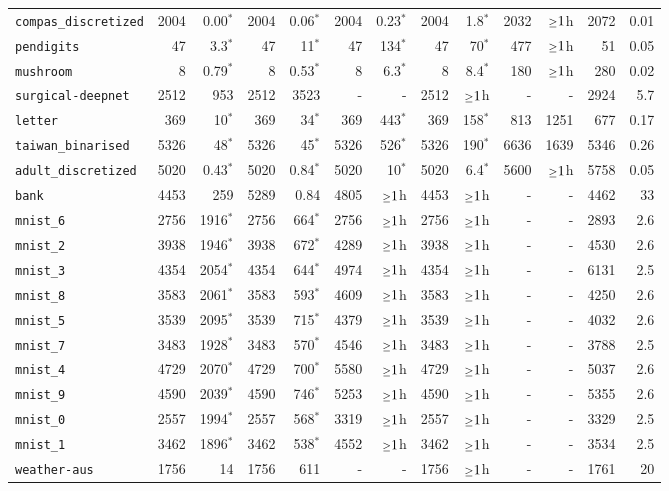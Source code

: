 \begin{tabular}{lrrrrrrrrrrrr}
\texttt{compas\_discretized} & 2004 & 0.00$^*$ & 2004 & 0.06$^*$ & 2004 & 0.23$^*$ & 2004 & 1.8$^*$ & 2032 & $\mathsmaller{\geq}1$h & 2072 & 0.01\\
\texttt{pendigits} & 47 & 3.3$^*$ & 47 & 11$^*$ & 47 & 134$^*$ & 47 & 70$^*$ & 477 & $\mathsmaller{\geq}1$h & 51 & 0.05\\
\texttt{mushroom} & 8 & 0.79$^*$ & 8 & 0.53$^*$ & 8 & 6.3$^*$ & 8 & 8.4$^*$ & 180 & $\mathsmaller{\geq}1$h & 280 & 0.02\\
\texttt{surgical-deepnet} & 2512 & 953 & 2512 & 3523 & - & - & 2512 & $\mathsmaller{\geq}1$h & - & - & 2924 & 5.7\\
\texttt{letter} & 369 & 10$^*$ & 369 & 34$^*$ & 369 & 443$^*$ & 369 & 158$^*$ & 813 & 1251 & 677 & 0.17\\
\texttt{taiwan\_binarised} & 5326 & 48$^*$ & 5326 & 45$^*$ & 5326 & 526$^*$ & 5326 & 190$^*$ & 6636 & 1639 & 5346 & 0.26\\
\texttt{adult\_discretized} & 5020 & 0.43$^*$ & 5020 & 0.84$^*$ & 5020 & 10$^*$ & 5020 & 6.4$^*$ & 5600 & $\mathsmaller{\geq}1$h & 5758 & 0.05\\
\texttt{bank} & 4453 & 259 & 5289 & 0.84 & 4805 & $\mathsmaller{\geq}1$h & 4453 & $\mathsmaller{\geq}1$h & - & - & 4462 & 33\\
\texttt{mnist\_6} & 2756 & 1916$^*$ & 2756 & 664$^*$ & 2756 & $\mathsmaller{\geq}1$h & 2756 & $\mathsmaller{\geq}1$h & - & - & 2893 & 2.6\\
\texttt{mnist\_2} & 3938 & 1946$^*$ & 3938 & 672$^*$ & 4289 & $\mathsmaller{\geq}1$h & 3938 & $\mathsmaller{\geq}1$h & - & - & 4530 & 2.6\\
\texttt{mnist\_3} & 4354 & 2054$^*$ & 4354 & 644$^*$ & 4974 & $\mathsmaller{\geq}1$h & 4354 & $\mathsmaller{\geq}1$h & - & - & 6131 & 2.5\\
\texttt{mnist\_8} & 3583 & 2061$^*$ & 3583 & 593$^*$ & 4609 & $\mathsmaller{\geq}1$h & 3583 & $\mathsmaller{\geq}1$h & - & - & 4250 & 2.6\\
\texttt{mnist\_5} & 3539 & 2095$^*$ & 3539 & 715$^*$ & 4379 & $\mathsmaller{\geq}1$h & 3539 & $\mathsmaller{\geq}1$h & - & - & 4032 & 2.6\\
\texttt{mnist\_7} & 3483 & 1928$^*$ & 3483 & 570$^*$ & 4546 & $\mathsmaller{\geq}1$h & 3483 & $\mathsmaller{\geq}1$h & - & - & 3788 & 2.5\\
\texttt{mnist\_4} & 4729 & 2070$^*$ & 4729 & 700$^*$ & 5580 & $\mathsmaller{\geq}1$h & 4729 & $\mathsmaller{\geq}1$h & - & - & 5037 & 2.6\\
\texttt{mnist\_9} & 4590 & 2039$^*$ & 4590 & 746$^*$ & 5253 & $\mathsmaller{\geq}1$h & 4590 & $\mathsmaller{\geq}1$h & - & - & 5355 & 2.6\\
\texttt{mnist\_0} & 2557 & 1994$^*$ & 2557 & 568$^*$ & 3319 & $\mathsmaller{\geq}1$h & 2557 & $\mathsmaller{\geq}1$h & - & - & 3329 & 2.5\\
\texttt{mnist\_1} & 3462 & 1896$^*$ & 3462 & 538$^*$ & 4552 & $\mathsmaller{\geq}1$h & 3462 & $\mathsmaller{\geq}1$h & - & - & 3534 & 2.5\\
\texttt{weather-aus} & 1756 & 14 & 1756 & 611 & - & - & 1756 & $\mathsmaller{\geq}1$h & - & - & 1761 & 20\\
\bottomrule
\end{tabular}
